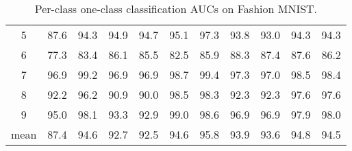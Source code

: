 \documentclass{article} \usepackage{iclr2021_conference,times}
\begin{document}
\begin{table}[ht]
{\begin{tabular}{c|c|c|c|c|c|c|c|c|c|c}
        5 & 87.6{\scriptsize} & 94.3{\scriptsize} & 94.9{\scriptsize} & 94.7{\scriptsize} & 95.1{\scriptsize} & 97.3{\scriptsize} & 93.8{\scriptsize} & 93.0{\scriptsize} & 94.3{\scriptsize} & 94.3{\scriptsize} \\
        6 & 77.3{\scriptsize} & 83.4{\scriptsize} & 86.1{\scriptsize} & 85.5{\scriptsize} & 82.5{\scriptsize} & 85.9{\scriptsize} & 88.3{\scriptsize} & 87.4{\scriptsize} & 87.6{\scriptsize} & 86.2{\scriptsize} \\
        7 & 96.9{\scriptsize} & 99.2{\scriptsize} & 96.9{\scriptsize} & 96.9{\scriptsize} & 98.7{\scriptsize} & 99.4{\scriptsize} & 97.3{\scriptsize} & 97.0{\scriptsize} & 98.5{\scriptsize} & 98.4{\scriptsize} \\
        8 & 92.2{\scriptsize} & 96.2{\scriptsize} & 90.9{\scriptsize} & 90.0{\scriptsize} & 98.5{\scriptsize} & 98.3{\scriptsize} & 92.3{\scriptsize} & 92.3{\scriptsize} & 97.6{\scriptsize} & 97.6{\scriptsize} \\
        9 & 95.0{\scriptsize} & 98.1{\scriptsize} & 93.3{\scriptsize} & 92.9{\scriptsize} & 99.0{\scriptsize} & 98.6{\scriptsize} & 96.9{\scriptsize} & 96.9{\scriptsize} & 97.9{\scriptsize} & 98.0{\scriptsize} \\
        \midrule
        mean & 87.4{\scriptsize} & 94.6{\scriptsize} & 92.7{\scriptsize} & 92.5{\scriptsize} & 94.6{\scriptsize} & 95.8{\scriptsize} & 93.9{\scriptsize} & 93.6{\scriptsize} & 94.8{\scriptsize} & 94.5{\scriptsize} \\
        \bottomrule
    \end{tabular}
    }
    \caption{Per-class one-class classification AUCs on Fashion MNIST.}
    \label{tab:per_class_aucs_fmnist}
\end{table}
\end{document}
